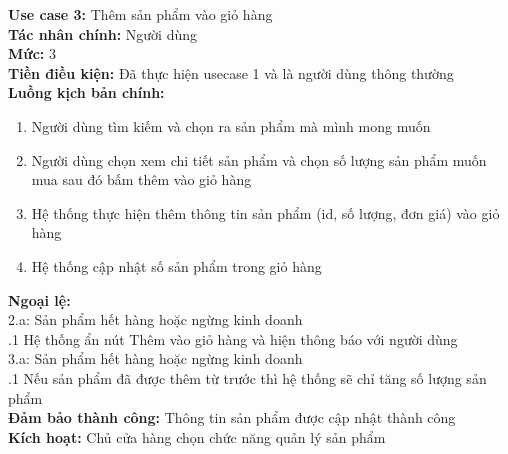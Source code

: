 \begin{boxed}
	\textbf{Use case 3:} Thêm sản phẩm vào giỏ hàng                                                \\
	\textbf{Tác nhân chính:} Người dùng                                                            \\
	\textbf{Mức:} 3                                                                                \\
	\textbf{Tiền điều kiện:} Đã thực hiện usecase 1 và là người dùng thông thường                  \\
	\textbf{Luồng kịch bản chính:}                                                                 \\
	\begin{enumerate}
		\vspace{-2em}
		\itemsep-0.5em
		\item Người dùng tìm kiếm và chọn ra sản phẩm mà mình mong muốn
		\item Người dùng chọn xem chi tiết sản phẩm và chọn số lượng sản phẩm muốn mua sau đó bấm thêm vào giỏ hàng
		\item Hệ thống thực hiện thêm thông tin sản phẩm  (id, số lượng, đơn giá) vào giỏ hàng
		\item Hệ thống cập nhật số sản phẩm trong giỏ hàng
		      \vspace{-1em}
	\end{enumerate}
	\textbf{Ngoại lệ:}                                                                             \\
	\hspace{1em}2.a: Sản phẩm hết hàng hoặc ngừng kinh doanh                                       \\
	\hspace{2.5em}.1 Hệ thống ẩn nút Thêm vào giỏ hàng và hiện thông báo với người dùng            \\
	\hspace{1em}3.a: Sản phẩm hết hàng hoặc ngừng kinh doanh                                       \\
	\hspace{2.5em}.1 Nếu sản phẩm đã được thêm từ trước thì hệ thống sẽ chỉ tăng số lượng sản phẩm \\
	\textbf{Đảm bảo thành công:} Thông tin sản phẩm được cập nhật thành công                       \\
	\textbf{Kích hoạt:} Chủ cửa hàng chọn chức năng quản lý sản phẩm
\end{boxed}

